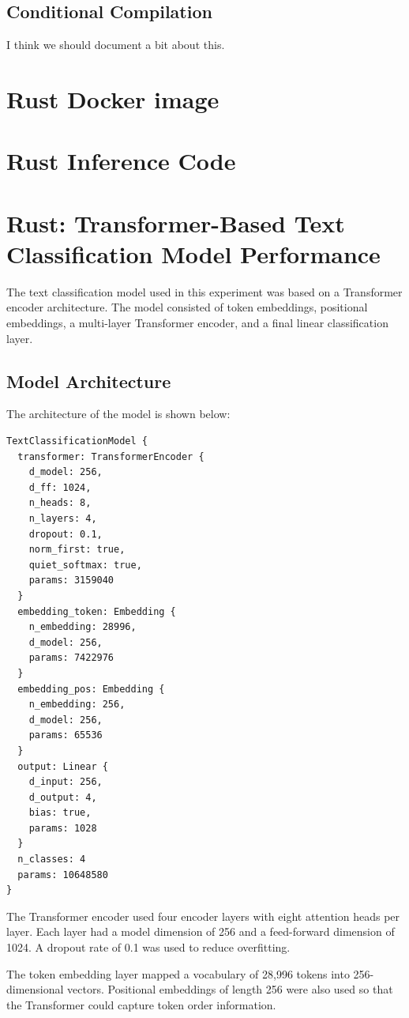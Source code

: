 \documentclass[11pt,a4paper]{article}
\begin{document}
\subsection{Conditional Compilation}
I think we should document a bit about this. 

\section{Rust Docker image}

\section{Rust Inference Code}

\section{Rust: Transformer-Based Text Classification Model Performance}

The text classification model used in this experiment was based on a Transformer encoder architecture. The model consisted of token embeddings, positional embeddings, a multi-layer Transformer encoder, and a final linear classification layer.

\subsection{Model Architecture}

The architecture of the model is shown below:

\begin{verbatim}
TextClassificationModel {
  transformer: TransformerEncoder {
    d_model: 256,
    d_ff: 1024,
    n_heads: 8,
    n_layers: 4,
    dropout: 0.1,
    norm_first: true,
    quiet_softmax: true,
    params: 3159040
  }
  embedding_token: Embedding {
    n_embedding: 28996,
    d_model: 256,
    params: 7422976
  }
  embedding_pos: Embedding {
    n_embedding: 256,
    d_model: 256,
    params: 65536
  }
  output: Linear {
    d_input: 256,
    d_output: 4,
    bias: true,
    params: 1028
  }
  n_classes: 4
  params: 10648580
}
\end{verbatim}

The Transformer encoder used four encoder layers with eight attention heads per layer. Each layer had a model dimension of 256 and a feed-forward dimension of 1024. A dropout rate of 0.1 was used to reduce overfitting.

The token embedding layer mapped a vocabulary of 28,996 tokens into 256-dimensional vectors. Positional embeddings of length 256 were also used so that the Transformer could capture token order information.
\end{document}
